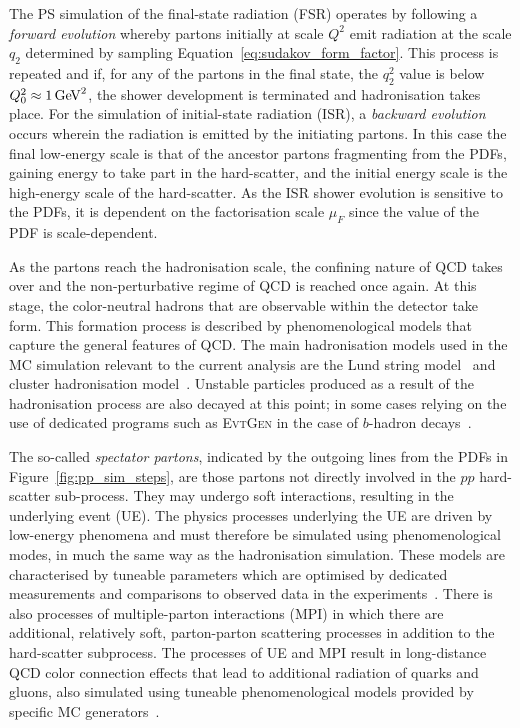 The PS simulation of the final-state radiation (FSR) operates by following a \textit{forward evolution} whereby partons initially at scale $Q^2$
emit radiation at the scale $q_2$ determined by sampling Equation~\ref{eq:sudakov_form_factor}. This process is repeated and if,
for any of the partons in the final state, the $q_2^2$ value is below $Q_0^2 \approx 1\,\text{Ge\kern -0.1em V}^2$, the shower development is terminated
and hadronisation takes place.
For the simulation of initial-state radiation (ISR), a \textit{backward evolution} occurs wherein the radiation is emitted
by the initiating partons. In this case the final low-energy scale is that of the ancestor partons fragmenting from the PDFs, gaining energy to take part
in the hard-scatter, and the initial energy scale is the high-energy scale of the hard-scatter.
As the ISR shower evolution is sensitive to the PDFs, it is dependent on the factorisation scale $\mu_F$ since the
value of the PDF is scale-dependent.

As the partons reach the hadronisation scale, the confining nature of QCD takes over and the non-perturbative regime of QCD is reached
once again.
At this stage, the color-neutral hadrons that are observable within the detector take form.
This formation process is described by phenomenological models that capture the general
features of QCD.
The main hadronisation models used in the MC simulation relevant to the current analysis are the
Lund string model~\cite{Andersson:1983ia} and cluster hadronisation model~\cite{Webber:1983if}.
Unstable particles produced as a result of the hadronisation process are also decayed at this point;
in some cases relying on the use of dedicated programs such as \textsc{EvtGen} in the case of $b$-hadron decays~\cite{Lange:2001uf}.

The so-called \textit{spectator partons}, indicated by the outgoing lines from the PDFs in Figure~\ref{fig:pp_sim_steps},
are those partons not directly involved in the $pp$ hard-scatter sub-process.
They may undergo soft interactions, resulting in the underlying event (UE).
The physics processes underlying the UE are driven by low-energy phenomena and must therefore
be simulated using phenomenological modes, in much the same way as the hadronisation simulation.
These models are characterised by tuneable parameters which are optimised by dedicated measurements
and comparisons to observed data in the experiments~\cite{UESim}.
There is also processes of multiple-parton interactions (MPI) in which there are additional,
relatively soft, parton-parton scattering processes in addition to the hard-scatter subprocess.
The processes of UE and MPI result in long-distance QCD color connection effects that lead
to additional radiation of quarks and gluons, also simulated using tuneable phenomenological models
provided by specific MC generators~\cite{Sjostrand:2006za,Butterworth:1996zw}.


